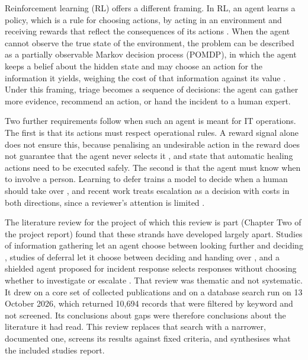 \documentclass[pdflatex,sn-basic]{sn-jnl}
\begin{document}
Reinforcement learning (RL) offers a different framing. In RL, an agent learns a policy, which is a rule for choosing actions, by acting in an environment and receiving rewards that reflect the consequences of its actions \citep{sutton2018}. When the agent cannot observe the true state of the environment, the problem can be described as a partially observable Markov decision process (POMDP), in which the agent keeps a belief about the hidden state and may choose an action for the information it yields, weighing the cost of that information against its value \citep{kaelbling1998}. Under this framing, triage becomes a sequence of decisions: the agent can gather more evidence, recommend an action, or hand the incident to a human expert.

Two further requirements follow when such an agent is meant for IT operations. The first is that its actions must respect operational rules. A reward signal alone does not ensure this, because penalising an undesirable action in the reward does not guarantee that the agent never selects it \citep{konighofer2025}, and \citet{remil2024} state that automatic healing actions need to be executed safely. The second is that the agent must know when to involve a person. Learning to defer trains a model to decide when a human should take over \citep{madras2018}, and recent work treats escalation as a decision with costs in both directions, since a reviewer's attention is limited \citep{turan2026}.

The literature review for the project of which this review is part (Chapter Two of the project report) found that these strands have developed largely apart. Studies of information gathering let an agent choose between looking further and deciding \citep{janisch2019,kim2025}, studies of deferral let it choose between deciding and handing over \citep{madras2018,joshi2023}, and a shielded agent proposed for incident response selects responses without choosing whether to investigate or escalate \citep{alauthman2026}. That review was thematic and not systematic. It drew on a core set of collected publications and on a database search run on 13 October 2026, which returned 10,694 records that were filtered by keyword and not screened. Its conclusions about gaps were therefore conclusions about the literature it had read. This review replaces that search with a narrower, documented one, screens its results against fixed criteria, and synthesises what the included studies report.
\end{document}
